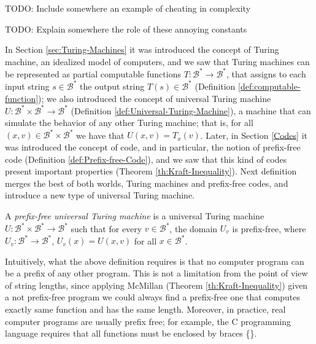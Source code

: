 {\color{red} TODO: Include somewhere an example of cheating in complexity}

{\color{red} TODO: Explain somewhere the role of these annoying constants}

In Section \ref{sec:Turing-Machines} it was introduced the concept of Turing machine, an idealized model of computers, and we saw that Turing machines can be represented as partial computable functions $T:\mathcal{B}^\ast \rightarrow \mathcal{B}^\ast$, that assigns to each input string $s \in \mathcal{B}^\ast$ the output string $T(s) \in \mathcal{B}^\ast$ (Definition \ref{def:computable-function}); we also introduced the concept of universal Turing machine $U:\mathcal{B}^\ast \times \mathcal{B}^\ast \rightarrow \mathcal{B}^\ast$ (Definition \ref{def:Universal-Turing-Machine}), a machine that can simulate the behavior of any other Turing machine; that is, for all $(x,v) \in  \mathcal{B}^\ast \times \mathcal{B}^\ast$ we have that $U(x,v) = T_{x}(v)$. Later, in Section \ref{Codes} it was introduced the concept of code, and in particular, the notion of prefix-free code (Definition \ref{def:Prefix-free-Code}), and we saw that this kind of codes present important properties (Theorem \ref{th:Kraft-Inequality}). Next definition merges the best of both worlds, Turing machines and prefix-free codes, and introduce a new type of universal Turing machine.

\begin{definition}
A \emph{prefix-free universal Turing machine} is a universal Turing machine $U:\mathcal{B}^\ast \times \mathcal{B}^\ast \rightarrow \mathcal{B}^\ast$ such that for every $v \in \mathcal{B}^\ast$, the domain $U_{v}$ is prefix-free, where $U_{v}:\mathcal{B}^\ast \rightarrow \mathcal{B}^\ast$, $U_{v}(x) = U(x, v)$ for all $x \in \mathcal{B}^\ast$.
\end{definition}


Intuitively, what the above definition requires is that no computer program can be a prefix of any other program. This is not a limitation from the point of view of string lengths, since applying McMillan (Theorem \ref{th:Kraft-Inequality}) given a not prefix-free program we could always find a prefix-free one that computes exactly same function and has the same length. Moreover, in practice, real computer programs are usually prefix free; for example, the C programming language requires that all functions must be enclosed by braces \{\}.

